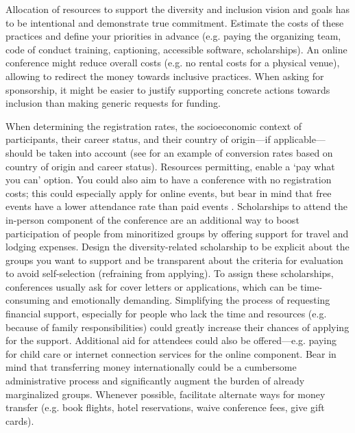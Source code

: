 \documentclass[10pt,letterpaper]{article}
\begin{document}
Allocation of resources to support the diversity and inclusion vision and goals has to be intentional and demonstrate true commitment. 
Estimate the costs of these practices and define your priorities in advance (e.g. paying the organizing team, code of conduct training, captioning, accessible software, scholarships).
An online conference might reduce overall costs (e.g. no rental costs for a physical venue), allowing to redirect the money towards inclusive practices. 
When asking for sponsorship, it might be easier to justify supporting concrete actions towards inclusion than making generic requests for funding.

When determining the registration rates, the socioeconomic context of participants, their career status, and their country of origin—if applicable—should be taken into account  \cite{sarabipourChangingScientificMeetings2021, andalibPostdocQueueLabour2018, kaplanPostdocNot2012}
(see \cite{canelon2021cost} for an example of conversion rates based on country of origin and career status).
Resources permitting, enable a `pay what you can' option. You could also aim to have a conference with no registration costs; this could especially apply for online events, but bear in mind that free events have a lower attendance rate than paid events \cite{eventbrite_ultimate_2017}. 
Scholarships to attend the in-person component of the conference are an additional way to boost participation of people from minoritized groups by offering support for travel and lodging expenses.
Design the diversity-related scholarship to be explicit about the groups you want to support and be transparent about the criteria for evaluation to avoid self-selection (refraining from applying). 
To assign these scholarships, conferences usually ask for cover letters or applications, which can be time-consuming and emotionally demanding. 
Simplifying the process of requesting financial support, especially for 
people who lack the time and resources (e.g. because of family responsibilities) could greatly increase their chances of applying for the support. 
Additional aid for attendees could also be offered—e.g. paying for child care or internet connection services for the online component. 
Bear in mind that transferring money internationally could be a cumbersome administrative process and significantly augment the burden of already marginalized groups. Whenever possible, facilitate alternate ways for money transfer (e.g. book flights, hotel reservations, waive conference fees, give gift cards). 
\end{document}
